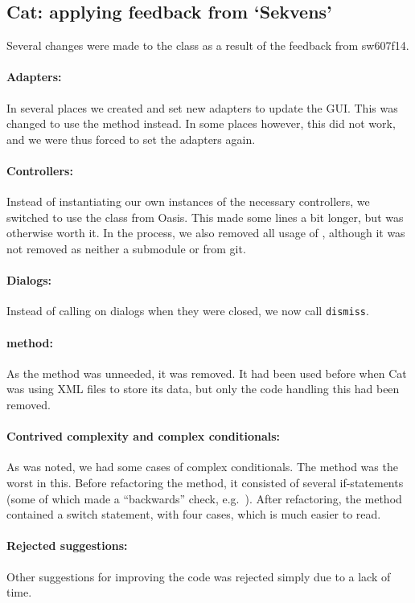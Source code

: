 \subsection{Cat: applying feedback from `Sekvens'}\label{subsec:collab_catresult}
Several changes were made to the class  as a result of the feedback from sw607f14.

\paragraph{Adapters:}
In several places we created and set new adapters to update the GUI. This was changed to use the  method instead. In some places however, this did not work, and we were thus forced to set the adapters again.

\paragraph{Controllers:}
Instead of instantiating our own instances of the necessary controllers, we switched to use the  class from Oasis. This made some lines a bit longer, but was otherwise worth it. In the process, we also removed all usage of , although it was not removed as neither a submodule or from git.

\paragraph{Dialogs:}
Instead of calling  on dialogs when they were closed, we now call \texttt{dismiss}.

\paragraph{ method:}
As the  method was unneeded, it was removed. It had been used before when Cat was using XML files to store its data, but only the code handling this had been removed.

\paragraph{Contrived complexity and complex conditionals:}
As was noted, we had some cases of complex conditionals. The  method was the worst in this. Before refactoring the method, it consisted of several if-statements (some of which made a ``backwards'' check, e.g.\ ). After refactoring, the method contained a switch statement, with four cases, which is much easier to read.

\paragraph{Rejected suggestions:}
Other suggestions for improving the code was rejected simply due to a lack of time.